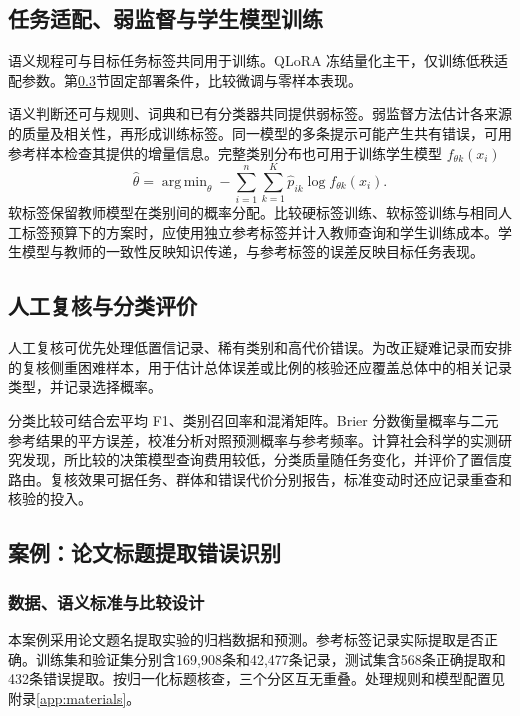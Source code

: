 \documentclass[UTF8,a4paper,zihao=-4,fontset=fandol]{ctexart}
\DeclareMathOperator*{\argmin}{arg\,min}
\begin{document}
\subsection{任务适配、弱监督与学生模型训练}

语义规程可与目标任务标签共同用于训练。QLoRA 冻结量化主干，仅训练低秩适配参数\citep{qlora2023}。第\ref{sec:title-case}节固定部署条件，比较微调与零样本表现。

语义判断还可与规则、词典和已有分类器共同提供弱标签。弱监督方法估计各来源的质量及相关性，再形成训练标签\citep{ratner2017}。同一模型的多条提示可能产生共有错误，可用参考样本检查其提供的增量信息。完整类别分布也可用于训练学生模型 $f_{\theta k}(x_i)$
\begin{equation}
 \widehat\theta=\argmin_\theta
 -\sum_{i=1}^n\sum_{k=1}^K\widehat p_{ik}\log f_{\theta k}(x_i).
 \label{eq:student}
\end{equation}
软标签保留教师模型在类别间的概率分配。比较硬标签训练、软标签训练与相同人工标签预算下的方案时，应使用独立参考标签并计入教师查询和学生训练成本。学生模型与教师的一致性反映知识传递，与参考标签的误差反映目标任务表现。

\subsection{人工复核与分类评价}

人工复核可优先处理低置信记录、稀有类别和高代价错误。为改正疑难记录而安排的复核侧重困难样本，用于估计总体误差或比例的核验还应覆盖总体中的相关记录类型，并记录选择概率。

分类比较可结合宏平均 F1、类别召回率和混淆矩阵。Brier 分数衡量概率与二元参考结果的平方误差，校准分析对照预测概率与参考频率\citep{guo2017}。计算社会科学的实测研究发现，所比较的决策模型查询费用较低，分类质量随任务变化，并评价了置信度路由\citep{ibrahim2026}。复核效果可据任务、群体和错误代价分别报告，标准变动时还应记录重查和核验的投入。

\subsection{案例：论文标题提取错误识别}\label{sec:title-case}

\subsubsection{数据、语义标准与比较设计}

本案例采用论文题名提取实验的归档数据和预测\citep{title-case}。参考标签记录实际提取是否正确。训练集和验证集分别含169,908条和42,477条记录，测试集含568条正确提取和432条错误提取。按归一化标题核查，三个分区互无重叠。处理规则和模型配置见附录\ref{app:materials}。
\end{document}
